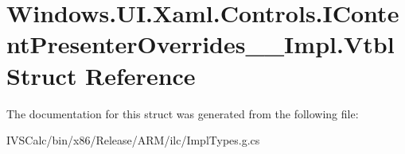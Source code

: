 \hypertarget{struct_windows_1_1_u_i_1_1_xaml_1_1_controls_1_1_i_content_presenter_overrides_____impl_1_1_vtbl}{}\section{Windows.\+U\+I.\+Xaml.\+Controls.\+I\+Content\+Presenter\+Overrides\+\_\+\+\_\+\+Impl.\+Vtbl Struct Reference}
\label{struct_windows_1_1_u_i_1_1_xaml_1_1_controls_1_1_i_content_presenter_overrides_____impl_1_1_vtbl}


The documentation for this struct was generated from the following file\+:\begin{DoxyCompactItemize}
\item 
I\+V\+S\+Calc/bin/x86/\+Release/\+A\+R\+M/ilc/Impl\+Types.\+g.\+cs\end{DoxyCompactItemize}
